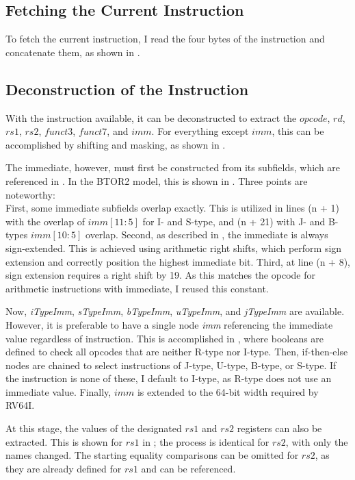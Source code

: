 \subsection{Fetching the Current Instruction}
To fetch the current instruction, I read the four bytes of the
instruction and concatenate them, as shown in .


\subsection{Deconstruction of the Instruction}
With the instruction available, it can be deconstructed to extract
the $opcode$, $rd$, $rs1$, $rs2$, $funct3$, $funct7$, and $imm$. For
everything except $imm$, this can be accomplished by shifting and
masking, as shown in .

The immediate, however, must first be constructed from its subfields,
which are referenced in . In the BTOR2
model, this is shown in .
 Three points are
noteworthy:\\ First, some immediate subfields overlap exactly. This
is utilized in lines (n + 1) with the overlap of $imm[11:5]$ for I-
and S-type, and (n + 21) with J- and B-types $imm[10:5]$ overlap.
Second, as described in , the immediate is
always sign-extended. This is achieved using arithmetic right shifts,
which perform sign extension and correctly position the highest
immediate bit. Third, at line (n + 8), sign extension requires a
right shift by 19. As this matches the opcode for arithmetic
instructions with immediate, I reused this constant.

Now, \textsl{iTypeImm}, \textsl{sTypeImm}, \textsl{bTypeImm},
\textsl{uTypeImm}, and \textsl{jTypeImm} are available. However, it
is preferable to have a single node \textsl{imm} referencing the
immediate value regardless of instruction. This is accomplished in
, where booleans are defined to check all
opcodes that are neither R-type nor I-type. Then, if-then-else nodes
are chained to select instructions of J-type, U-type, B-type, or
S-type. If the instruction is none of these, I default to I-type, as
R-type does not use an immediate value. Finally, $imm$ is extended to
the 64-bit width required by RV64I.

At this stage, the values of the designated $rs1$ and $rs2$ registers
can also be extracted. This is shown for $rs1$ in
; the process is identical for $rs2$, with
only the names changed. The starting equality comparisons can be
omitted for $rs2$, as they are already defined for $rs1$ and can be
referenced.

